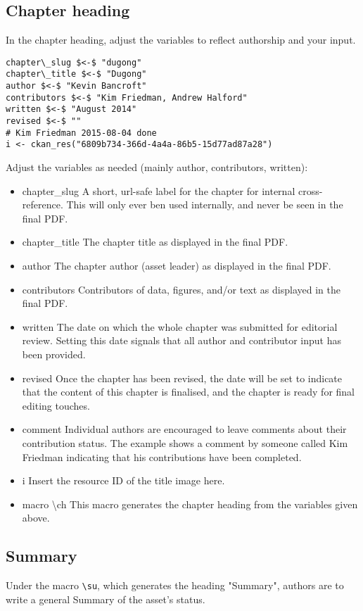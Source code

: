 \subsection*{Chapter heading}
In the chapter heading, adjust the variables to reflect authorship and your input.
{\small\begin{verbatim}
chapter\_slug $<-$ "dugong"
chapter\_title $<-$ "Dugong"
author $<-$ "Kevin Bancroft"
contributors $<-$ "Kim Friedman, Andrew Halford"
written $<-$ "August 2014"
revised $<-$ ""
# Kim Friedman 2015-08-04 done
i <- ckan_res("6809b734-366d-4a4a-86b5-15d77ad87a28")
\end{verbatim}}

Adjust the variables as needed (mainly author, contributors, written):
\begin{itemize}
\item{chapter\_slug} A short, url-safe label for the chapter for internal cross-reference.
This will only ever ben used internally, and never be seen in the final PDF.
\item{chapter\_title} The chapter title as displayed in the final PDF.
\item{author} The chapter author (asset leader) as displayed in the final PDF.
\item{contributors} Contributors of data, figures, and/or text as displayed in the
final PDF.
\item{written} The date on which the whole chapter was submitted for editorial review.
Setting this date signals that all author and contributor input has been provided.
\item{revised} Once the chapter has been revised, the date will be set to indicate
that the content of this chapter is finalised, and the chapter is ready for final
editing touches.
\item{comment} Individual authors are encouraged to leave comments about their contribution status.
The example shows a comment by someone called Kim Friedman indicating that his
contributions have been completed.
\item{i} Insert the resource ID of the title image here.
\item{macro \textbackslash ch} This macro generates the chapter heading from the
variables given above.
\end{itemize}

\subsection*{Summary}
Under the macro \texttt{\textbackslash su}, which generates the heading "Summary",
authors are to write a general Summary of the asset's status.

